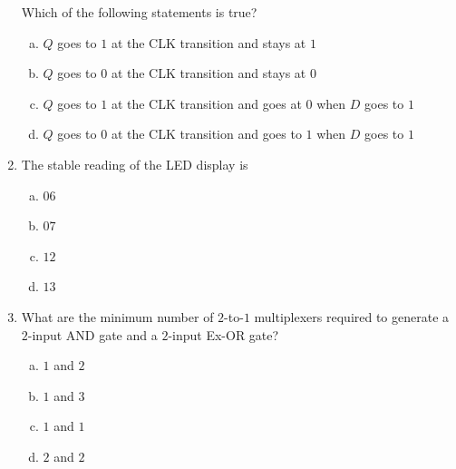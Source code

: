 \documentclass[journal,12pt,twocolumn]{IEEEtran}
\begin{document}
\begin{enumerate}
\begin{figure}
\caption{}

\label{fig:35}

\end{figure} 


 
Which of the following statements is true?

\begin{enumerate}[(a)]

\item $Q$ goes to $1$ at the CLK transition and stays at $1$

\item $Q$ goes to $0$ at the CLK transition and stays at $0$

\item $Q$ goes to $1$ at the CLK transition and goes at $0$ when $D$ goes to $1$

\item $Q$ goes to $0$ at the CLK transition and goes to $1$ when $D$ goes to $1$

\end{enumerate}

\item The stable reading of the LED display is

\begin{enumerate}[(a)]

\item $ 06 $

\item  $ 07 $

\item $ 12 $

\item $ 13 $

\end{enumerate}

\item What are the minimum number of $2$-to-$1$ multiplexers required to generate a $2$-input AND gate and a $2$-input Ex-OR gate?

\begin{enumerate}[(a)]

\item $1$ and $2$

\item $1$ and $3$

\item $1$ and $1$

\item $2$ and $2$

\end{enumerate}


\end{enumerate}
\end{document}
